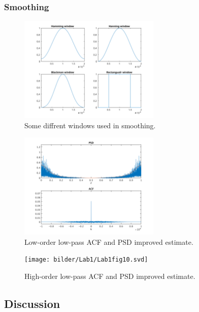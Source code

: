 
\subsubsection{Smoothing}

\begin{figure}[!ht]
\centering
\includegraphics[width=0.6\textwidth]{bilder/Lab1/Lab1fig11.svg}
\caption{Some diffrent windows used in smoothing.}
\label{fig:Lab1fig11}
\end{figure}

\begin{figure}[!ht]
\centering
\includegraphics[width=0.6\textwidth]{bilder/Lab1/Lab1fig9.svg}
\caption{Low-order low-pass ACF and PSD improved estimate.}
\label{fig:Lab1fig9}
\end{figure}

\begin{figure}[!ht]
\centering
\texttt{[image: bilder/Lab1/Lab1fig10.svd]}
\caption{High-order low-pass ACF and PSD improved estimate.}
\label{fig:Lab1fig10}
\end{figure}


\subsection{Discussion}

